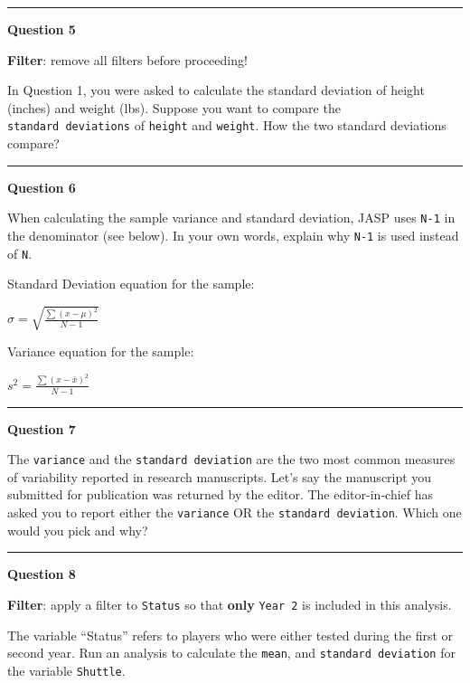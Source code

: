 \documentclass[11pt,]{article}
\begin{document}
\begin{center}\rule{0.5\linewidth}{0.5pt}\end{center}

\textbf{Question 5}

\textbf{Filter}: remove all filters before proceeding!

In Question 1, you were asked to calculate the standard deviation of
height (inches) and weight (lbs). Suppose you want to compare the
\texttt{standard\ deviations} of \texttt{height} and \texttt{weight}.
How the two standard deviations compare?

\begin{center}\rule{0.5\linewidth}{0.5pt}\end{center}

\textbf{Question 6}

When calculating the sample variance and standard deviation, JASP uses
\texttt{N-1} in the denominator (see below). In your own words, explain
why \texttt{N-1} is used instead of \texttt{N}.

Standard Deviation equation for the sample:

\(\sigma = \sqrt{\frac{\sum (x - \mu)^2}{N-1}}\)

Variance equation for the sample:

\(s^2 = \frac{\sum (x - \bar{x})^2}{N - 1}\)

\begin{center}\rule{0.5\linewidth}{0.5pt}\end{center}

\textbf{Question 7}

The \texttt{variance} and the \texttt{standard\ deviation} are the two
most common measures of variability reported in research manuscripts.
Let's say the manuscript you submitted for publication was returned by
the editor. The editor-in-chief has asked you to report either the
\texttt{variance} OR the \texttt{standard\ deviation}. Which one would
you pick and why?

\begin{center}\rule{0.5\linewidth}{0.5pt}\end{center}

\textbf{Question 8}

\textbf{Filter}: apply a filter to \texttt{Status} so that \textbf{only}
\texttt{Year\ 2} is included in this analysis.

The variable ``Status'' refers to players who were either tested during
the first or second year. Run an analysis to calculate the
\texttt{mean}, and \texttt{standard\ deviation} for the variable
\texttt{Shuttle}.
\end{document}
